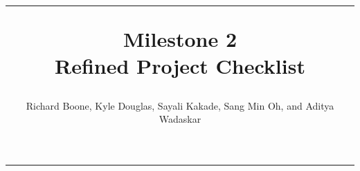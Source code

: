 \documentclass[12pt]{article}
\title{\rule{7in}{1pt}
	Milestone 2 \\ 
	\Large Refined Project Checklist}
\author{Richard Boone, Kyle Douglas, Sayali Kakade, Sang Min Oh, and Aditya Wadaskar}
\begin{document}
\maketitle\vspace{-45pt}

\begin{center}
\rule{7in}{1pt}
\end{center}




\end{document}
